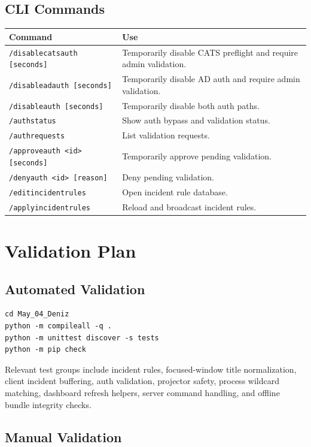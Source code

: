 \documentclass[12pt,a4paper]{article}
\begin{document}
\subsection{CLI Commands}

\begin{longtable}{L{0.34\textwidth} L{0.56\textwidth}}
\textbf{Command} & \textbf{Use} \\
\hline
\texttt{/disablecatsauth [seconds]} & Temporarily disable CATS preflight and require admin validation. \\
\texttt{/disableadauth [seconds]} & Temporarily disable AD auth and require admin validation. \\
\texttt{/disableauth [seconds]} & Temporarily disable both auth paths. \\
\texttt{/authstatus} & Show auth bypass and validation status. \\
\texttt{/authrequests} & List validation requests. \\
\texttt{/approveauth <id> [seconds]} & Temporarily approve pending validation. \\
\texttt{/denyauth <id> [reason]} & Deny pending validation. \\
\texttt{/editincidentrules} & Open incident rule database. \\
\texttt{/applyincidentrules} & Reload and broadcast incident rules. \\
\end{longtable}

\section{Validation Plan}

\subsection{Automated Validation}

\begin{verbatim}
cd May_04_Deniz
python -m compileall -q .
python -m unittest discover -s tests
python -m pip check
\end{verbatim}

Relevant test groups include incident rules, focused-window title normalization,
client incident buffering, auth validation, projector safety, process wildcard
matching, dashboard refresh helpers, server command handling, and offline bundle
integrity checks.

\subsection{Manual Validation}
\end{document}
